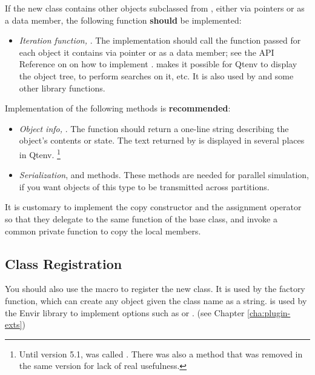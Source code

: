 If the new class contains other objects subclassed from ,
either via pointers or as a data member, the following function \textbf{should}
be implemented:

\begin{itemize}
  \item \textit{Iteration function,} .
        The implementation should call the function passed
        for each object it contains via pointer or as a data member;
        see the API Reference on  on how to implement
        .  makes it possible
        for Qtenv to display the object tree, to perform searches on it, etc.
        It is also used by  and some other library functions.
\end{itemize}

Implementation of the following methods is \textbf{recommended}:

\begin{itemize}
  \item \textit{Object info,} . The  function
        should return a one-line string describing the object's contents or state.
        The text returned by  is displayed in several places in Qtenv.
        \footnote{Until {\opp} version 5.1,  was called .
        There was also a  method that was removed in the
        same version for lack of real usefulness.}
  \item \textit{Serialization},  and  methods.
        These methods are needed for parallel simulation, if you want
        objects of this type to be transmitted across partitions.
\end{itemize}

It is customary to implement the copy constructor and the assignment operator
so that they delegate to the same function of the base class, and invoke a common
private  function to copy the local members.

\subsection{Class Registration}
\label{sec:sim-lib:class-registration}

You should also use the  macro to register the
new class. It is used by the  factory function, which can
create any object given the class name as a string. 
is used by the Envir library to implement  options
such as  or .
(see Chapter \ref{cha:plugin-exts})

